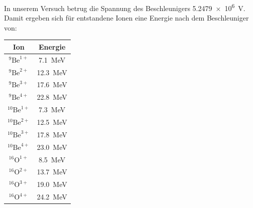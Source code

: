 In unserem Versuch betrug die Spannung des Beschleunigers \SI{5.2479e6}{\volt}.
Damit ergeben sich für entstandene Ionen eine Energie nach dem Beschleuniger von:
\begin{center}
  \begin{tabular}{|c|c|}
    \hline
    Ion & Energie \\
    \hline
    $^{9}\text{Be}^{1+}$ & \SI{7.1}{\mega\electronvolt} \\
    $^{9}\text{Be}^{2+}$ & \SI{12.3}{\mega\electronvolt} \\
    $^{9}\text{Be}^{3+}$ & \SI{17.6}{\mega\electronvolt} \\
    $^{9}\text{Be}^{4+}$ & \SI{22.8}{\mega\electronvolt} \\
    \hline
    $^{10}\text{Be}^{1+}$ & \SI{7.3}{\mega\electronvolt} \\
    $^{10}\text{Be}^{2+}$ & \SI{12.5}{\mega\electronvolt} \\
    $^{10}\text{Be}^{3+}$ & \SI{17.8}{\mega\electronvolt} \\
    $^{10}\text{Be}^{4+}$ & \SI{23.0}{\mega\electronvolt} \\
    \hline
    $^{16}\text{O}^{1+}$ & \SI{8.5}{\mega\electronvolt} \\
    $^{16}\text{O}^{2+}$ & \SI{13.7}{\mega\electronvolt} \\
    $^{16}\text{O}^{3+}$ & \SI{19.0}{\mega\electronvolt} \\
    $^{16}\text{O}^{4+}$ & \SI{24.2}{\mega\electronvolt} \\
    \hline
  \end{tabular}
  \label{Auswertung_tab_Ionenenergien_nach_Besch}
\end{center}

